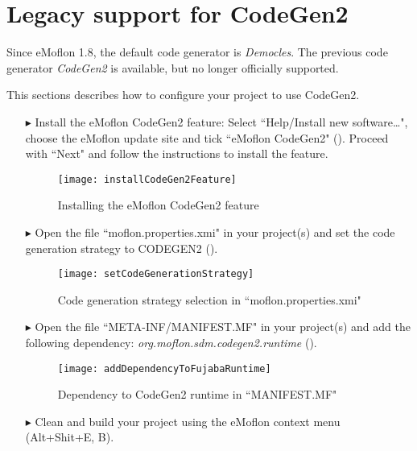\newpage
\section{Legacy support for CodeGen2}
\genHeader

Since eMoflon 1.8, the default code generator is \emph{Democles}.
The previous code generator \emph{CodeGen2} is available, but no longer
officially supported.

This sections describes how to configure your project to use CodeGen2.

\begin{itemize}

\item[$\blacktriangleright$] 
Install the eMoflon CodeGen2 feature:
Select ``Help/Install new software\dots", choose the eMoflon update site and tick
``eMoflon CodeGen2" ().
Proceed with ``Next" and follow the instructions to install the feature.

\begin{figure}[htbp]
    \begin{center} 
        \texttt{[image: installCodeGen2Feature]}
        \caption{Installing the eMoflon CodeGen2 feature}  
        \label{legacyCodegen2:installCodeGen2Feature}
    \end{center}
\end{figure}


\item[$\blacktriangleright$] 
Open the file ``moflon.properties.xmi" in your project(s) and set the code generation strategy to CODEGEN2  ().

\begin{figure}[htbp]
    \begin{center} 
        \texttt{[image: setCodeGenerationStrategy]}
        \caption{Code generation strategy selection in ``moflon.properties.xmi"}  
        \label{legacyCodegen2:changeCodeGenerationstrategy}
    \end{center}
\end{figure}


\item[$\blacktriangleright$] 
Open the file ``META-INF/MANIFEST.MF" in your project(s) and add the following dependency: \emph{org.moflon.sdm.codegen2.runtime} ().

\begin{figure}[htbp]
    \begin{center} 
        \texttt{[image: addDependencyToFujabaRuntime]}
        \caption{Dependency to CodeGen2 runtime in ``MANIFEST.MF"}  
        \label{legacyCodegen2:addDependencyToFujabaRuntime}
    \end{center}
\end{figure}

\item[$\blacktriangleright$] 
Clean and build your project using the eMoflon context menu (Alt+Shit+E, B).

\end{itemize}
